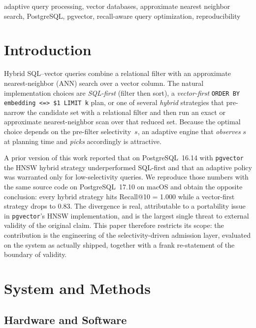 \documentclass[conference]{IEEEtran}
\begin{document}
\begin{IEEEkeywords}
adaptive query processing, vector databases, approximate nearest neighbor
search, PostgreSQL, pgvector, recall-aware query optimization,
reproducibility
\end{IEEEkeywords}

\section{Introduction}
\label{sec:intro}

Hybrid SQL--vector queries combine a relational filter with an approximate
nearest-neighbor (ANN) search over a vector column. The natural
implementation choices are \emph{SQL-first} (filter then sort), a
\emph{vector-first} \texttt{ORDER BY embedding <=> \$1 LIMIT k} plan, or
one of several \emph{hybrid} strategies that pre-narrow the candidate set
with a relational filter and then run an exact or approximate
nearest-neighbor scan over that reduced set. Because the optimal choice
depends on the pre-filter selectivity~$s$, an adaptive engine that
\emph{observes} $s$ at planning time and \emph{picks} accordingly is
attractive.

A prior version of this work reported that on PostgreSQL~16.14 with
\texttt{pgvector} the HNSW hybrid strategy underperformed SQL-first and
that an adaptive policy was warranted only for low-selectivity queries.
We reproduce those numbers with the same source code on PostgreSQL~17.10
on macOS and obtain the opposite conclusion: every hybrid strategy hits
Recall@10 = 1.000 while a vector-first strategy drops to 0.83. The
divergence is real, attributable to a portability issue in
\texttt{pgvector}'s HNSW implementation, and is the largest single threat
to external validity of the original claim. This paper therefore
restricts its scope: the contribution is the engineering of the
selectivity-driven admission layer, evaluated on the system as actually
shipped, together with a frank re-statement of the boundary of validity.

\section{System and Methods}
\label{sec:system}

\subsection{Hardware and Software}
\label{sec:hw}
\end{document}
